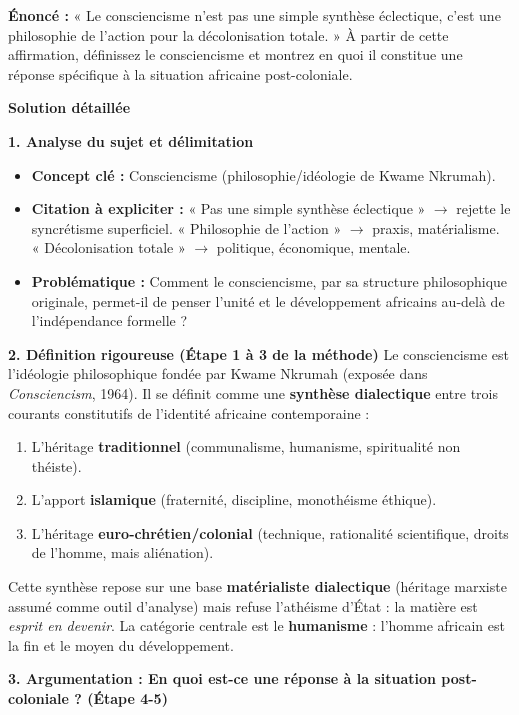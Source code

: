 \documentclass[11pt]{article}
\newcommand{\cle}[1]{{\popxbold\color{popdark}#1}}
\begin{document}
\begin{exoresolu}
\textbf{Énoncé :} « Le consciencisme n'est pas une simple synthèse éclectique, c'est une philosophie de l'action pour la décolonisation totale. » À partir de cette affirmation, définissez le consciencisme et montrez en quoi il constitue une réponse spécifique à la situation africaine post-coloniale.

\tcblower
\textbf{Solution détaillée}

\textbf{1. Analyse du sujet et délimitation}
\begin{itemize}
    \item \textbf{Concept clé :} Consciencisme (philosophie/idéologie de Kwame Nkrumah).
    \item \textbf{Citation à expliciter :} « Pas une simple synthèse éclectique » $\rightarrow$ rejette le syncrétisme superficiel. « Philosophie de l'action » $\rightarrow$ praxis, matérialisme. « Décolonisation totale » $\rightarrow$ politique, économique, mentale.
    \item \textbf{Problématique :} Comment le consciencisme, par sa structure philosophique originale, permet-il de penser l'unité et le développement africains au-delà de l'indépendance formelle ?
\end{itemize}

\textbf{2. Définition rigoureuse (Étape 1 à 3 de la méthode)}
Le \cle{consciencisme} est l'idéologie philosophique fondée par \cle{Kwame Nkrumah} (exposée dans \emph{Consciencism}, 1964). Il se définit comme une \textbf{synthèse dialectique} entre trois courants constitutifs de l'identité africaine contemporaine :
\begin{enumerate}
    \item L'héritage \textbf{traditionnel} (communalisme, humanisme, spiritualité non théiste).
    \item L'apport \textbf{islamique} (fraternité, discipline, monothéisme éthique).
    \item L'héritage \textbf{euro-chrétien/colonial} (technique, rationalité scientifique, droits de l'homme, mais aliénation).
\end{enumerate}
Cette synthèse repose sur une base \textbf{matérialiste dialectique} (héritage marxiste assumé comme outil d'analyse) mais refuse l'athéisme d'État : la matière est \emph{esprit en devenir}. La catégorie centrale est le \textbf{humanisme} : l'homme africain est la fin et le moyen du développement.

\textbf{3. Argumentation : En quoi est-ce une réponse à la situation post-coloniale ? (Étape 4-5)}


\end{exoresolu}
\end{document}
